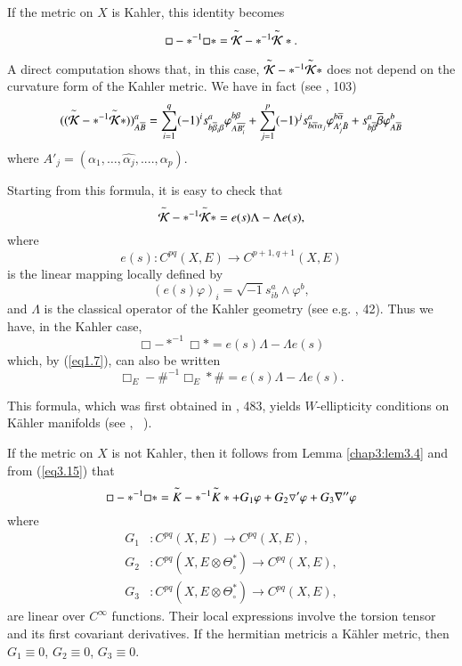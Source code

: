 If the metric on $X$ is Kahler, this identity becomes
$$   
\Box - *^{-1}\Box * = \overset{\thicksim}{\mathcal {K}}
- *^{-1}\overset{\thicksim}{\mathcal {K}} *.
$$

A direct computation shows that, in this case,
$\overset{\thicksim}{\mathcal {K}}-*^{-1}\overset{\thicksim}{\mathcal 
  {K}}*$ does not depend on the curvature form of the Kahler
metric. We have in fact (see \cite{key2}, 103) 
$$ 
((\overset{\thicksim}{\mathcal {K}}-*^{-1}\overset{\thicksim}{\mathcal 
  {K}} *)    )^a _{A\overline{B}} = \overset{q}{\underset{i=1}\sum} 
(-1)^i s^a_{b \overline{\beta}_i \beta} \varphi^{b \beta}_{A
  \overline{B'_i}} + \overset{p}{\underset{j=1}\sum}(-1)^j
s^a_{b\overline{\alpha} \alpha_j} \varphi^{b
  \overline{\alpha}}_{A'_j\bar{B}} +
   s^a_{b \overline{\beta}}  \overline{\beta}
  \varphi^b_{A\overline{B}}
$$
where $A'_j= (\alpha_1,\ldots, \hat{\alpha_j} ,....,\alpha_p)$.

Starting from this formula, it is easy to check that 
$$   
  \overset{\thicksim}{\mathcal {K}}- *^{-1}\overset{\thicksim}{\mathcal
    {K}} *= e (s) \Lambda - \Lambda e (s),
$$
where\pageoriginale
$$
e(s):C^{pq}(X,E)\rightarrow C^{p+1, q+1}(X,E)
$$
is the linear mapping locally defined by
$$
 (e(s)\varphi)_{i}= \sqrt{-1} s ^{a}_{ib}\wedge \varphi^{b},
$$
and $\Lambda$ is the classical operator of the Kahler geometry (see
e.g. \cite{key35}, 42). Thus we have, in the Kahler case, 
$$
\Box - \ast^{-1} \Box * = e(s)\Lambda - \Lambda e(s)
$$
which, by (\ref{eq1.7}), can also be written
$$ 
\Box_{E} - \# ^{-1} \Box_{E}\ast \# = e(s) \Lambda - \Lambda e(s).
$$

This formula, which was first obtained in \cite{key4}, 483, yields
$W$-ellipti\-city conditions on K\"ahler manifolds (see \cite{key2}, ~).

If the metric on $X$ is not Kahler, then it follows from Lemma
\ref{chap3:lem3.4} and from (\ref{eq3.15}) that 
$$
\Box - \ast^{-1} \Box \ast = \overset{\thicksim}{K}-\ast^{-1}
\overset{\thicksim}{K}\ast + G_{1} \varphi + G_{2}\triangledown '
\varphi + G_{3}\nabla''  \varphi 
$$
where
\begin{align*}
  G_{1} &: C^{pq}(X, E)\rightarrow C^{pq}(X,E),\\
  G_{2} &: C^{pq}(X, E\otimes \Theta^{\ast}_{\circ})\rightarrow C^{pq}(X,E),\\
  G_{3} &: C^{pq}(X, E\otimes \Theta^{\ast}_{\circ})\rightarrow C^{pq}(X,E),
\end{align*}
are linear over $C^{\infty}$ functions. Their local expressions
involve the torsion tensor and its first covariant derivatives. If the 
hermitian metric\pageoriginale is a K\"ahler metric, then $G_{1}
\equiv 0$, $G_{2} \equiv 0$, $G_{3} \equiv 0$.  

